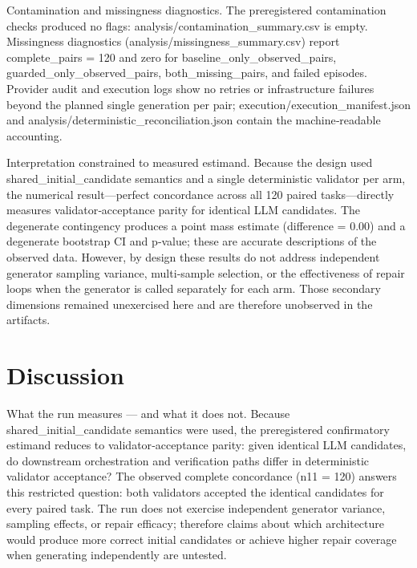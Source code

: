 \documentclass[conference]{IEEEtran}
\begin{document}
Contamination and missingness diagnostics. The preregistered contamination checks produced no flags: analysis/contamination\_summary.csv is empty. Missingness diagnostics (analysis/missingness\_summary.csv) report complete\_pairs = 120 and zero for baseline\_only\_observed\_pairs, guarded\_only\_observed\_pairs, both\_missing\_pairs, and failed episodes. Provider audit and execution logs show no retries or infrastructure failures beyond the planned single generation per pair; execution/execution\_manifest.json and analysis/deterministic\_reconciliation.json contain the machine‑readable accounting.

Interpretation constrained to measured estimand. Because the design used shared\_initial\_candidate semantics and a single deterministic validator per arm, the numerical result---perfect concordance across all 120 paired tasks---directly measures validator‑acceptance parity for identical LLM candidates. The degenerate contingency produces a point mass estimate (difference = 0.00) and a degenerate bootstrap CI and p‑value; these are accurate descriptions of the observed data. However, by design these results do not address independent generator sampling variance, multi‑sample selection, or the effectiveness of repair loops when the generator is called separately for each arm. Those secondary dimensions remained unexercised here and are therefore unobserved in the artifacts.

\section{Discussion}
What the run measures --- and what it does not. Because shared\_initial\_candidate semantics were used, the preregistered confirmatory estimand reduces to validator‑acceptance parity: given identical LLM candidates, do downstream orchestration and verification paths differ in deterministic validator acceptance? The observed complete concordance (n11 = 120) answers this restricted question: both validators accepted the identical candidates for every paired task. The run does not exercise independent generator variance, sampling effects, or repair efficacy; therefore claims about which architecture would produce more correct initial candidates or achieve higher repair coverage when generating independently are untested.
\end{document}
